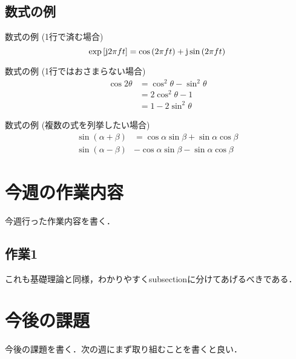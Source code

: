 \documentclass[fleqn, a4paper, twocolumn]{jsarticle}
\numberwithin{figure}{section}
\numberwithin{table}{section}
\numberwithin{equation}{section}
\begin{document}
\subsection{数式の例}
数式の例 (1行で済む場合)
\begin{equation}
	\exp \qty[\mathrm{j}2\pi ft] = \cos \qty(2\pi ft) + \mathrm{j}\sin \qty(2\pi ft)
	\label{eq: euler}
\end{equation}

数式の例 (1行ではおさまらない場合)
\begin{equation}
	\begin{split}
		\cos 2\theta & = \cos^2\theta-\sin^2\theta \\ %
		             & = 2\cos^2\theta - 1         \\         %
		             & = 1 - 2\sin^2\theta         %
		\label{eq: doubleangle}
	\end{split}
\end{equation}

数式の例 (複数の式を列挙したい場合)
\begin{align}
	\sin (\alpha + \beta) & = \cos \alpha \sin \beta + \sin \alpha \cos \beta \\
	\sin (\alpha - \beta) & - \cos \alpha \sin \beta - \sin \alpha \cos \beta
\end{align}

\section{今週の作業内容}
今週行った作業内容を書く．
\subsection{作業1}
これも基礎理論と同様，わかりやすくsubsectionに分けてあげるべきである．

\section{今後の課題}
今後の課題を書く．次の週にまず取り組むことを書くと良い．

\end{document}
